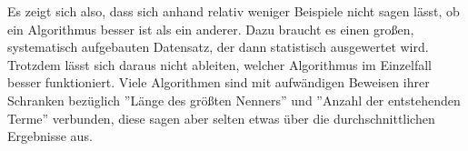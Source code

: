 Es zeigt sich also, dass sich anhand relativ weniger Beispiele nicht sagen lässt, ob ein Algorithmus besser ist als ein anderer. Dazu braucht es einen großen, systematisch aufgebauten Datensatz, der dann statistisch ausgewertet wird. Trotzdem lässt sich daraus nicht ableiten, welcher Algorithmus im Einzelfall besser funktioniert. Viele Algorithmen sind mit aufwändigen Beweisen ihrer Schranken bezüglich ''Länge des größten Nenners'' und ''Anzahl der entstehenden Terme'' verbunden, diese sagen aber selten etwas über die durchschnittlichen Ergebnisse aus.